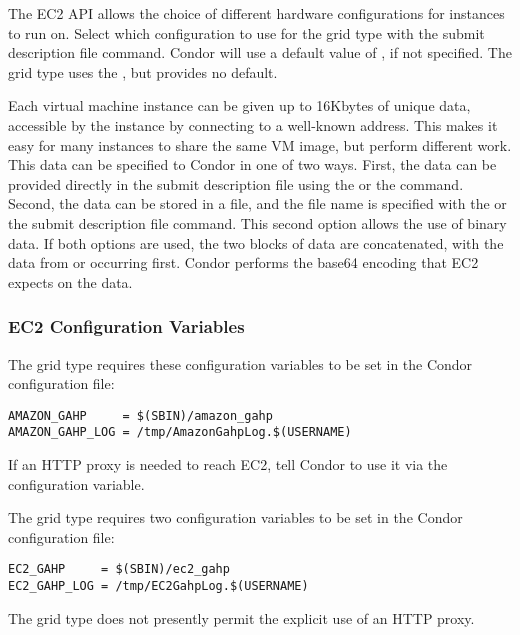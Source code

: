The EC2 API allows the choice of different hardware configurations 
for instances to run on.
Select which configuration to use for the  grid type
with the  submit description file command.
Condor will use a default value of
, if not specified.
The  grid type uses the , 
but provides no default.

Each virtual machine instance can be given up to 16Kbytes of unique data, 
accessible by the instance by connecting to a well-known address.
This makes it easy for many instances to share the same VM image,
but perform different work.
This data can be specified to Condor in one of two ways.
First, the data can be provided directly in the submit description file 
using the  
or the  command.
Second, the data can be
stored in a file, and the file name is specified with the
or the  submit description file command.
This second option allows the use of binary data.
If both options are used, the two blocks of
data are concatenated, with the data from 
or  occurring first.
Condor performs the base64 encoding that EC2 expects on the data.

\subsubsection{\label{sec:Amazon-config}EC2 Configuration Variables}

The  grid type requires these configuration variables 
to be set in the Condor configuration file:

\footnotesize
\begin{verbatim}
AMAZON_GAHP     = $(SBIN)/amazon_gahp
AMAZON_GAHP_LOG = /tmp/AmazonGahpLog.$(USERNAME)
\end{verbatim}
\normalsize

If an HTTP proxy is needed to reach EC2, tell Condor to use it
via the  configuration variable.

The  grid type requires two configuration variables to be
set in the Condor configuration file:

\footnotesize
\begin{verbatim}
EC2_GAHP     = $(SBIN)/ec2_gahp
EC2_GAHP_LOG = /tmp/EC2GahpLog.$(USERNAME)
\end{verbatim}
\normalsize

The  grid type does not presently permit the explicit use 
of an HTTP proxy.


